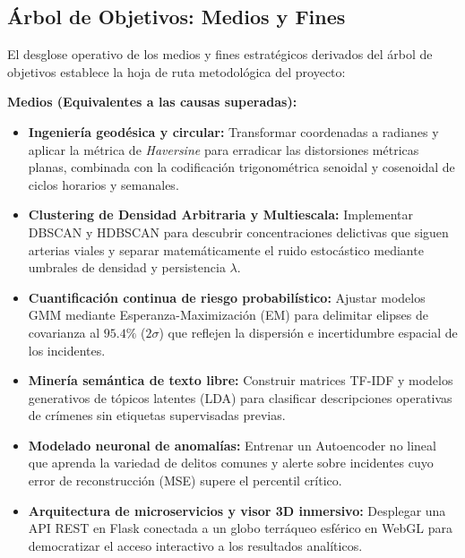 \subsection{Árbol de Objetivos: Medios y Fines}

El desglose operativo de los medios y fines estratégicos derivados del árbol de objetivos establece la hoja de ruta metodológica del proyecto:

\textbf{Medios (Equivalentes a las causas superadas):}
\begin{itemize}
    \item \textbf{Ingeniería geodésica y circular:} Transformar coordenadas a radianes y aplicar la métrica de \textit{Haversine} para erradicar las distorsiones métricas planas, combinada con la codificación trigonométrica senoidal y cosenoidal de ciclos horarios y semanales.
    \item \textbf{Clustering de Densidad Arbitraria y Multiescala:} Implementar DBSCAN y HDBSCAN para descubrir concentraciones delictivas que siguen arterias viales y separar matemáticamente el ruido estocástico mediante umbrales de densidad y persistencia $\lambda$.
    \item \textbf{Cuantificación continua de riesgo probabilístico:} Ajustar modelos GMM mediante Esperanza-Maximización (EM) para delimitar elipses de covarianza al $95.4\%$ ($2\sigma$) que reflejen la dispersión e incertidumbre espacial de los incidentes.
    \item \textbf{Minería semántica de texto libre:} Construir matrices TF-IDF y modelos generativos de tópicos latentes (LDA) para clasificar descripciones operativas de crímenes sin etiquetas supervisadas previas.
    \item \textbf{Modelado neuronal de anomalías:} Entrenar un Autoencoder no lineal que aprenda la variedad de delitos comunes y alerte sobre incidentes cuyo error de reconstrucción (MSE) supere el percentil crítico.
    \item \textbf{Arquitectura de microservicios y visor 3D inmersivo:} Desplegar una API REST en Flask conectada a un globo terráqueo esférico en WebGL para democratizar el acceso interactivo a los resultados analíticos.
\end{itemize}

